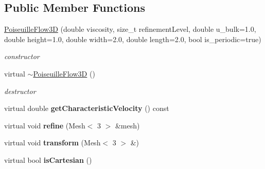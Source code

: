 \subsection*{Public Member Functions}
\begin{DoxyCompactItemize}
\item 
\hyperlink{classnatrium_1_1PoiseuilleFlow3D_a65444fdaec3bb59ab98870acfcb297f1}{PoiseuilleFlow3D} (double viscosity, size\_\-t refinementLevel, double u\_\-bulk=1.0, double height=1.0, double width=2.0, double length=2.0, bool is\_\-periodic=true)
\begin{DoxyCompactList}\small\item\em constructor \item\end{DoxyCompactList}\item 
\hypertarget{classnatrium_1_1PoiseuilleFlow3D_a79c1655f3e863583bf8752550f3448bf}{
virtual \hyperlink{classnatrium_1_1PoiseuilleFlow3D_a79c1655f3e863583bf8752550f3448bf}{$\sim$PoiseuilleFlow3D} ()}
\label{classnatrium_1_1PoiseuilleFlow3D_a79c1655f3e863583bf8752550f3448bf}

\begin{DoxyCompactList}\small\item\em destructor \item\end{DoxyCompactList}\item 
\hypertarget{classnatrium_1_1PoiseuilleFlow3D_a78bb2ddc867df9204ec2fa5cda48c7d9}{
virtual double {\bfseries getCharacteristicVelocity} () const }
\label{classnatrium_1_1PoiseuilleFlow3D_a78bb2ddc867df9204ec2fa5cda48c7d9}

\item 
\hypertarget{classnatrium_1_1PoiseuilleFlow3D_a80c9ef01d1629030d52be9a6a005cc66}{
virtual void {\bfseries refine} (Mesh$<$ 3 $>$ \&mesh)}
\label{classnatrium_1_1PoiseuilleFlow3D_a80c9ef01d1629030d52be9a6a005cc66}

\item 
\hypertarget{classnatrium_1_1PoiseuilleFlow3D_ae9cc344fb2f2c1badd80e43341dbb3fe}{
virtual void {\bfseries transform} (Mesh$<$ 3 $>$ \&)}
\label{classnatrium_1_1PoiseuilleFlow3D_ae9cc344fb2f2c1badd80e43341dbb3fe}

\item 
\hypertarget{classnatrium_1_1PoiseuilleFlow3D_aa58fe6166886d8423c198f192931e957}{
virtual bool {\bfseries isCartesian} ()}
\label{classnatrium_1_1PoiseuilleFlow3D_aa58fe6166886d8423c198f192931e957}

\end{DoxyCompactItemize}


